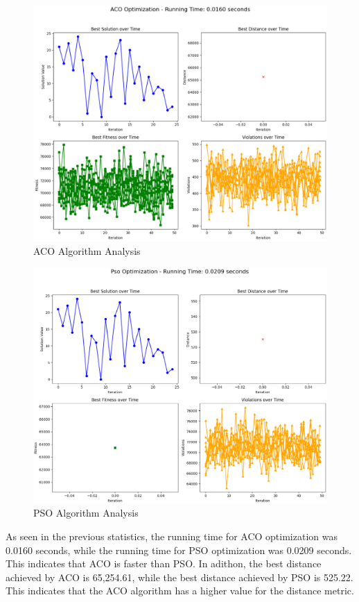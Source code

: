\begin{figure}[H]  %
    \centering
    \includegraphics[width=1\linewidth]{figures/Aco_Results.PNG}
    \caption{ACO Algorithm Analysis}
    \label{fig:ACO_Analysis}
\end{figure}

\begin{figure}[H]  %
    \centering
    \includegraphics[width=1\linewidth]{figures/Pso_Results.PNG}
    \caption{PSO Algorithm Analysis}
    \label{fig:PSO_Analysis}
\end{figure}
As seen in the previous statistics, the running time for ACO optimization was 0.0160 seconds, while the running time for PSO optimization was 0.0209 seconds. This indicates that ACO is faster than PSO. 
\newline
In adithon, the best distance achieved by ACO is 65,254.61, while the best distance achieved by PSO is 525.22. This indicates that the ACO algorithm has a higher value for the distance metric.

